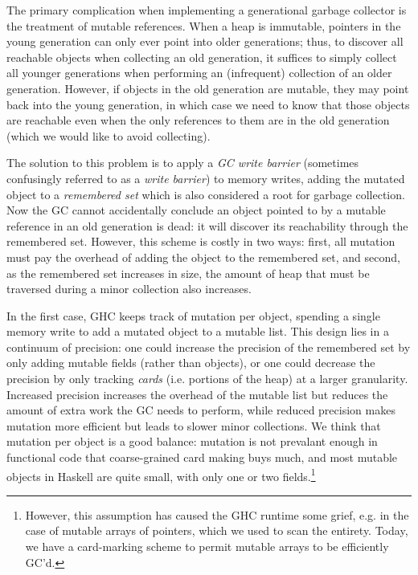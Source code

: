 The primary complication when implementing a generational garbage
collector is the treatment of mutable references.  When a heap is
immutable, pointers in the young generation can only ever point into
older generations; thus, to discover all reachable objects when
collecting an old generation, it suffices to simply collect all younger
generations when performing an (infrequent) collection of an older
generation.  However, if objects in the old generation are mutable, they
may point back into the young generation, in which case we need to know
that those objects are reachable even when the only references to them
are in the old generation (which we would like to avoid collecting).

The solution to this problem is to apply a \emph{GC write barrier}
(sometimes confusingly referred to as a \emph{write barrier}) to memory
writes, adding the mutated object to a \emph{remembered set} which is
also considered a root for garbage collection.  Now the GC cannot
accidentally conclude an object pointed to by a mutable reference in an
old generation is dead: it will discover its reachability through the
remembered set.  However, this scheme is costly in two ways: first, all
mutation must pay the overhead of adding the object to the remembered
set, and second, as the remembered set increases in size, the amount of
heap that must be traversed during a minor collection also increases.

In the first case, GHC keeps track of mutation per object, spending a
single memory write to add a mutated object to a mutable list.  This
design lies in a continuum of precision: one could increase the
precision of the remembered set by only adding mutable fields (rather
than objects), or one could decrease the precision by only tracking
\emph{cards} (i.e. portions of the heap) at a larger granularity.
Increased precision increases the overhead of the mutable list but
reduces the amount of extra work the GC needs to perform, while reduced
precision makes mutation more efficient but leads to slower minor
collections.  We think that mutation per object is a good balance: mutation
is not prevalant enough in functional code that coarse-grained card making
buys much, and most mutable objects in Haskell are quite small, with only
one or two fields.\footnote{However, this assumption has caused the GHC runtime
some grief, e.g. in the case of mutable arrays of pointers, which we used to
scan the entirety.  Today, we have a card-marking scheme to permit mutable
arrays to be efficiently GC'd.}

